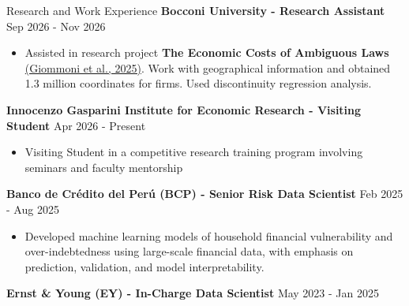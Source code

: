 \documentclass{resume} %
\begin{document}
\begin{rSection}{Research and Work Experience}
{\bf Bocconi University - Research Assistant} \hfill{Sep 2026 - Nov 2026}
\begin{itemize}
\setlength\itemsep{-0.5em}
    \item Assisted in research project \textbf{The Economic Costs of Ambiguous Laws} \href{https://www.ifo.de/DocDL/cesifo1_wp11929.pdf}{(Giommoni et al., 2025)}. Work with geographical information and obtained 1.3 million coordinates for firms. Used discontinuity regression analysis.  
\end{itemize}

{\bf Innocenzo Gasparini Institute for Economic Research - Visiting Student} \hfill {Apr 2026 - Present}
\begin{itemize}
\setlength\itemsep{-0.5em}
    \item  Visiting Student in a competitive research training program involving seminars and faculty mentorship
\end{itemize}


{\bf Banco de Crédito del Perú (BCP) - Senior Risk Data Scientist} \hfill {Feb 2025 - Aug 2025}
\begin{itemize}
\setlength\itemsep{-0.5em}
    \item Developed machine learning models of household financial vulnerability and over-indebtedness using large-scale financial data, with emphasis on prediction, validation, and model interpretability. %
\end{itemize}


{\bf Ernst \& Young (EY) - In-Charge Data Scientist} \hfill {May 2023 - Jan 2025}
\begin{itemize}
\setlength\itemsep{-0.5em}


\end{itemize}
\end{rSection}
\end{document}
